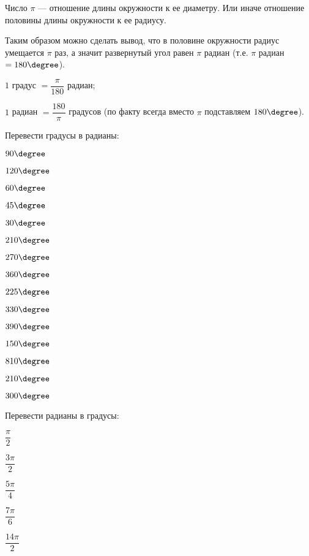 \begin{class}[number=4]
\begin{definit}
	\end{definit}
	\begin{definit}
		Число \( \pi \) --- отношение длины окружности к ее диаметру. Или иначе отношение половины длины окружности к ее радиусу.
	\end{definit}
	Таким образом можно сделать вывод, что в половине окружности радиус умещается \( \pi \) раз, а значит развернутый угол равен \( \pi \) радиан (т.е. \( \pi \) радиан \( = 180\degree \)).
	\begin{enumcols}
		\item \( 1 \) градус \( = \dfrac{\pi}{180} \) радиан;
		\item \( 1 \) радиан \( = \dfrac{180}{\pi}\) градусов (по факту всегда вместо \( \pi \) подставляем \( 180\degree \)).
	\end{enumcols}
	\begin{listofex}[resume]
		\item Перевести градусы в радианы:
		\begin{enumcols}[itemcolumns=5]
			\item \( 90\degree \)
			\item \( 120\degree \)
			\item \( 60\degree \)
			\item \( 45\degree \)
			\item \( 30\degree \)
			\item \( 210\degree \)
			\item \( 270\degree \)
			\item \( 360\degree \)
			\item \( 225\degree \)
			\item \( 330\degree \)
			\item \( 390\degree \)
			\item \( 150\degree \)
			\item \( 810\degree \)
			\item \( 210\degree \)
			\item \( 300\degree \)
		\end{enumcols}
		\newpage
		\item Перевести радианы в градусы:
		\begin{enumcols}[itemcolumns=5]
			\item \( \dfrac{\pi}{2} \)
			\item \( \dfrac{3\pi}{2} \)
			\item \( \dfrac{5\pi}{4} \)
			\item \( \dfrac{7\pi}{6} \)
			\item \( \dfrac{14\pi}{2} \)

\end{enumcols}
\end{listofex}
\end{class}
